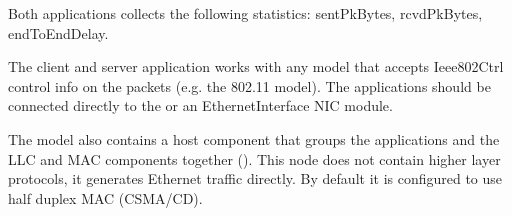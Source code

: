 Both applications collects the following statistics: sentPkBytes, rcvdPkBytes,
endToEndDelay.

The client and server application works with any model that accepts
Ieee802Ctrl control info on the packets (e.g. the 802.11 model).
The applications should be connected directly to the 
or an EthernetInterface NIC module.

The model also contains a host component that groups the applications
and the LLC and MAC components together (). This node does
not contain higher layer protocols, it generates Ethernet traffic directly.
By default it is configured to use half duplex MAC (CSMA/CD).




